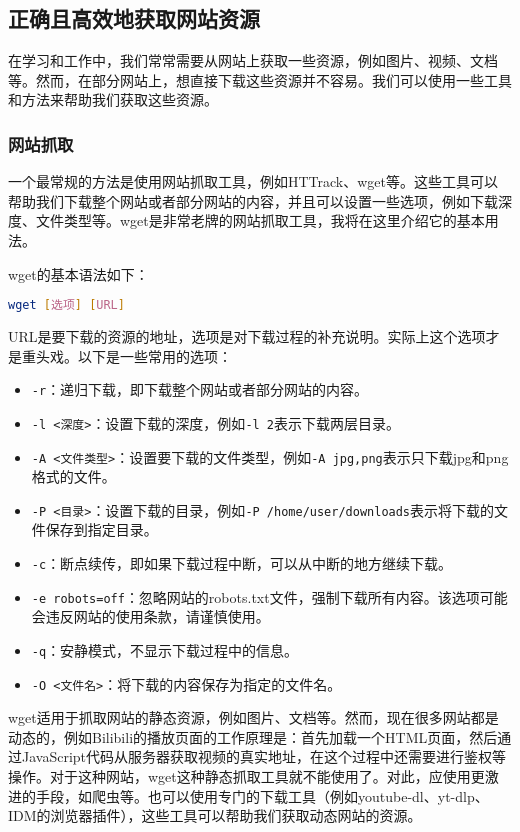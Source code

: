 \subsection{正确且高效地获取网站资源}

在学习和工作中，我们常常需要从网站上获取一些资源，例如图片、视频、文档等。然而，在部分网站上，想直接下载这些资源并不容易。我们可以使用一些工具和方法来帮助我们获取这些资源。

\subsubsection{网站抓取}

一个最常规的方法是使用网站抓取工具，例如HTTrack、wget等。这些工具可以帮助我们下载整个网站或者部分网站的内容，并且可以设置一些选项，例如下载深度、文件类型等。wget是非常老牌的网站抓取工具，我将在这里介绍它的基本用法。

wget的基本语法如下：
\begin{lstlisting}[language=bash]
    wget [选项] [URL]
\end{lstlisting}
URL是要下载的资源的地址，选项是对下载过程的补充说明。实际上这个选项才是重头戏。以下是一些常用的选项：
\begin{itemize}
  \item \texttt{-r}：递归下载，即下载整个网站或者部分网站的内容。
  \item \texttt{-l <深度>}：设置下载的深度，例如\texttt{-l 2}表示下载两层目录。
  \item \texttt{-A <文件类型>}：设置要下载的文件类型，例如\texttt{-A jpg,png}表示只下载jpg和png格式的文件。
  \item \texttt{-P <目录>}：设置下载的目录，例如\texttt{-P /home/user/downloads}表示将下载的文件保存到指定目录。
  \item \texttt{-c}：断点续传，即如果下载过程中断，可以从中断的地方继续下载。
  \item \texttt{-e robots=off}：忽略网站的robots.txt文件，强制下载所有内容。该选项可能会违反网站的使用条款，请谨慎使用。
  \item \texttt{-q}：安静模式，不显示下载过程中的信息。
  \item \texttt{-O <文件名>}：将下载的内容保存为指定的文件名。
\end{itemize}
wget适用于抓取网站的静态资源，例如图片、文档等。然而，现在很多网站都是动态的，例如Bilibili的播放页面的工作原理是：首先加载一个HTML页面，然后通过JavaScript代码从服务器获取视频的真实地址，在这个过程中还需要进行鉴权等操作。对于这种网站，wget这种静态抓取工具就不能使用了。对此，应使用更激进的手段，如爬虫等。也可以使用专门的下载工具（例如youtube-dl、yt-dlp、IDM的浏览器插件），这些工具可以帮助我们获取动态网站的资源。

